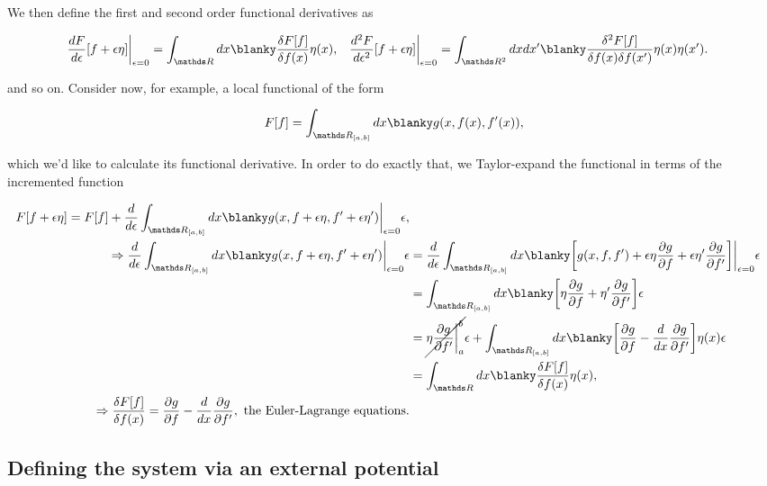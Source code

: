 \documentclass{homework}
\begin{document}
We then define the first and second order functional derivatives as 

\begin{align}
\frac{dF}{d\epsilon}[f+\epsilon \eta]\bigg|_{\epsilon = 0} &= \int_{\R} dx \blanky \frac{\delta F[f]}{\delta f(x)} \eta(x),
& \frac{d^2 F}{d\epsilon^2}[f+\epsilon \eta]\bigg|_{\epsilon = 0} &= \int_{\R^2} dx dx' \blanky \frac{\delta^2 F[f]}{\delta f(x) \delta f(x')} \eta(x) \eta(x').
\end{align}

and so on. Consider now, for example, a local functional of the form

$$
F[f] = \int_{\R_{[a,b]}} dx \blanky g(x, f(x), f'(x)),
$$

which we'd like to calculate its functional derivative. In order to do exactly that, we Taylor-expand the functional in terms of the incremented function 

\begin{align*}
    F[f+\epsilon \eta] = F[f] + \frac{d}{d\epsilon} \int_{\R_{[a,b]}} dx \blanky g(x, f+\epsilon \eta, f'+\epsilon \eta')\bigg|_{\epsilon = 0} \epsilon, \\
    \Rightarrow \frac{d}{d\epsilon} \int_{\R_{[a,b]}} dx \blanky g(x, f+\epsilon \eta, f'+\epsilon \eta')\bigg|_{\epsilon = 0} \epsilon &= \frac{d}{d\epsilon} \int_{\R_{[a,b]}} dx \blanky\bigg[ g(x,f,f') + \epsilon \eta \frac{\partial g}{\partial f}  + \epsilon \eta' \frac{\partial g}{\partial f'} \bigg]\bigg|_{\epsilon = 0} \epsilon \\
    &= \int_{\R_{[a,b]}} dx \blanky\bigg[\eta \frac{\partial g}{\partial f}  + \eta' \frac{\partial g}{\partial f'} \bigg] \epsilon \\
    &= \cancel{\eta \frac{\partial g}{\partial f'}\bigg|_{a}^{b}} \epsilon + \int_{\R_{[a,b]}} dx \blanky\bigg[ \frac{\partial g}{\partial f}  - \frac{d}{dx}\frac{\partial g}{\partial f'} \bigg] \eta (x) \epsilon \\
    &= \int_{\R} dx \blanky \frac{\delta F[f]}{\delta f(x)} \eta(x),\\
\Rightarrow \frac{\delta F[f]}{\delta f(x)} = \frac{\partial g}{\partial f}  - \frac{d}{dx}\frac{\partial g}{\partial f'}, \textnormal{ the Euler-Lagrange equations.} 
 \end{align*}
 
\clearpage

\subsection{Defining the system via an external potential}
\end{document}
